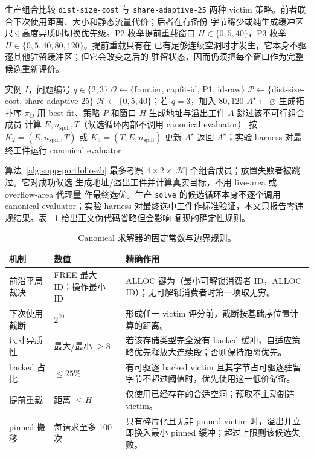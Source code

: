 生产组合比较 \texttt{dist-size-cost} 与 \texttt{share-adaptive-25} 两种
victim 策略。前者联合下次使用距离、大小和静态流量代价；后者在有备份
字节稀少或纯生成缓冲区尺寸高度异质时切换优先级。P2 枚举提前重载窗口
$H\in\{0,5,40\}$，P3 枚举 $H\in\{0,5,40,80,120\}$。提前重载只有在
已有足够连续空洞时才发生，它本身不驱逐其他驻留缓冲区；但它会改变之后的
驻留状态，因而仍须把每个窗口作为完整候选重新评价。

\begin{algorithm}[H]
\caption{P2/P3 有界工件组合}\label{alg:supp-portfolio-zh}
\begin{algorithmic}[1]
\Require 实例 $I$，问题编号 $q\in\{2,3\}$
\State $\mathcal O\gets\{$frontier, capfit-id, P1, id-raw$\}$
\State $\mathcal P\gets\{$dist-size-cost, share-adaptive-25$\}$
\State $\mathcal H\gets\{0,5,40\}$；若 $q=3$，加入 $80,120$
\State $A^\star\gets\varnothing$
  \State 生成拓扑序 $\pi_O$
  \State 用 best-fit、策略 $P$ 和窗口 $H$ 生成地址与溢出工件 $A$
   \State 跳过该不可行组合成员 \EndIf
  \State 计算 $E,n_{\mathrm{spill}},T$（候选循环内部不调用 canonical evaluator）
  \State 按 $K_2=(E,n_{\mathrm{spill}},T)$ 或 $K_3=(T,E,n_{\mathrm{spill}})$ 更新 $A^\star$
\EndFor
\State 返回 $A^\star$；实验 harness 对最终工件运行 canonical evaluator
\end{algorithmic}
\end{algorithm}

算法~\ref{alg:supp-portfolio-zh} 最多考察
$4\times2\times|\mathcal H|$ 个组合成员；放置失败者被跳过。它对成功候选
生成地址/溢出工件并计算真实目标，不用 live-area 或 overflow-area 代理量
作最终选优。生产 \texttt{solve} 的候选循环本身不逐个调用 canonical
evaluator；实验 harness 对最终选中工件作标准验证，本文只报告零违规结果。表
~\ref{tab:supp-implementation-constants-zh} 给出正文伪代码省略但会影响
复现的确定性规则。

\begin{table}[H]
\centering
\caption{Canonical 求解器的固定常数与边界规则。}
\label{tab:supp-implementation-constants-zh}
\begin{tabular}{@{}p{.22\linewidth}p{.15\linewidth}p{.55\linewidth}@{}}
\toprule
机制 & 数值 & 精确作用\\
\midrule
前沿平局裁决 & FREE 最大 ID；操作最小 ID & ALLOC 键为（最小可解锁消费者 ID，ALLOC ID）；无可解锁消费者时第一项取无穷。\\
下次使用截断 & $2^{20}$ & 形成任一 victim 评分前，截断按基础序位置计算的距离。\\
尺寸异质性 & 最大/最小 $\ge8$ & 若该存储类型完全没有 backed 缓冲，自适应策略优先释放大连续段；否则保持距离优先。\\
backed 占比 & $\le25\%$ & 有可驱逐 backed victim 且其字节占可驱逐驻留字节不超过阈值时，优先使用这一低价储备。\\
提前重载 & 距离 $\le H$ & 仅使用已经存在的合适空洞；预取不主动制造 victim。\\
pinned 搬移 & 每请求至多 100 次 & 只有碎片化且无非 pinned victim 时，溢出并立即换入最小 pinned 缓冲；超过上限则该候选失败。\\
\bottomrule
\end{tabular}
\end{table}

